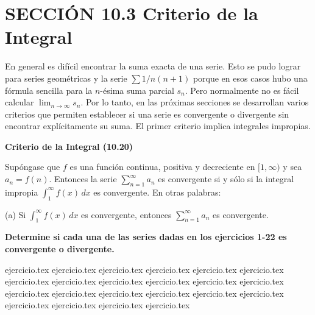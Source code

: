 
\section*{SECCIÓN 10.3 \quad Criterio de la Integral}

En general es difícil encontrar la suma exacta de una serie. Esto se pudo lograr para series geométricas y la serie $\sum 1/n(n+1)$ porque en esos casos hubo una fórmula sencilla para la $n$-ésima suma parcial $s_n$. Pero normalmente no es fácil calcular $\lim_{n \to \infty} s_n$. Por lo tanto, en las próximas secciones se desarrollan varios criterios que permiten establecer si una serie es convergente o divergente sin encontrar explícitamente su suma. El primer criterio implica integrales impropias.

\vspace{0.3cm}
\noindent\textbf{Criterio de la Integral (10.20)}

Supóngase que $f$ es una función continua, positiva y decreciente en $[1, \infty)$ y sea $a_n = f(n)$. Entonces la serie $\sum_{n=1}^\infty a_n$ es convergente si y sólo si la integral impropia $\int_1^\infty f(x) \, dx$ es convergente. En otras palabras:

(a) Si $\displaystyle\int_1^\infty f(x) \, dx$ es convergente, entonces $\displaystyle\sum_{n=1}^\infty a_n$ es convergente.

\vspace{0.5cm}
\noindent\textbf{Determine si cada una de las series dadas en los ejercicios 1-22 es convergente o divergente.}
\begin{enumerate}
    {ejercicio.tex}
{ejercicio.tex}
{ejercicio.tex}
{ejercicio.tex}
{ejercicio.tex}
{ejercicio.tex}
{ejercicio.tex}
{ejercicio.tex}
{ejercicio.tex}
{ejercicio.tex}
{ejercicio.tex}
{ejercicio.tex}
{ejercicio.tex}
{ejercicio.tex}
{ejercicio.tex}
{ejercicio.tex}
{ejercicio.tex}
{ejercicio.tex}
{ejercicio.tex}
{ejercicio.tex}
{ejercicio.tex}
{ejercicio.tex}
\end{enumerate}

